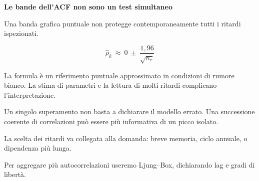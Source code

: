 \documentclass[12pt,aspectratio=1610]{beamer}
\newcommand{\PBody}[1]{\par{\fontsize{11.3}{14.8}\selectfont #1\par}}
\newcommand{\PSmall}[1]{\par{\fontsize{9.8}{13.1}\selectfont #1\par}}
\newcommand{\PInfo}[1]{%
\begin{tcolorbox}[enhanced,arc=1.6mm,boxrule=.55pt,colback=GeoTint,
 colframe=Rule!80!Classical,left=2.3mm,right=2.3mm,top=2mm,bottom=2mm,
 before skip=1mm,after skip=1mm]
\PSmall{#1}\end{tcolorbox}}
\begin{document}
\begin{frame}[plain]\hypertarget{slide63}{}
\begin{lrbox}{\TitleBox}
\begin{minipage}[t]{17.7cm}\raggedright\color{Ink}\fontsize{11.3}{14.8}\selectfont
\color{Navy}\bfseries\fontsize{20.6}{24.5}\selectfont Le bande dell’ACF non sono un test simultaneo
\end{minipage}\end{lrbox}

\begin{lrbox}{\RecallBox}
\begin{minipage}[t]{14.3cm}\raggedright\color{Ink}\fontsize{11.3}{14.8}\selectfont
\fontsize{10.3}{13.8}\selectfont Una banda grafica puntuale non protegge contemporaneamente tutti i ritardi ispezionati.
\end{minipage}\end{lrbox}

\begin{lrbox}{\PilotLeftBox}
\begin{minipage}[t]{10.05cm}\raggedright\color{Ink}\fontsize{11.3}{14.8}\selectfont
\[\widehat\rho_k\ \approx\ 0\ \pm\ \frac{1{,}96}{\sqrt{n_r}}\]
\PInfo{La formula è un riferimento puntuale approssimato in condizioni di rumore bianco. La stima di parametri e la lettura di molti ritardi complicano l’interpretazione.}

\end{minipage}\end{lrbox}

\begin{lrbox}{\PilotRightBox}
\begin{minipage}[t]{7.55cm}\raggedright\color{Ink}\fontsize{11.3}{14.8}\selectfont
\PBody{Un singolo superamento non basta a dichiarare il modello errato. Una successione coerente di correlazioni può essere più informativa di un picco isolato.}
\vspace{2.5mm}
\PBody{La scelta dei ritardi va collegata alla domanda: breve memoria, ciclo annuale, o dipendenza più lunga.}
\vspace{2.5mm}
\PSmall{Per aggregare più autocorrelazioni useremo Ljung--Box, dichiarando lag e gradi di libertà.}

\end{minipage}\end{lrbox}


\end{frame}
\end{document}
